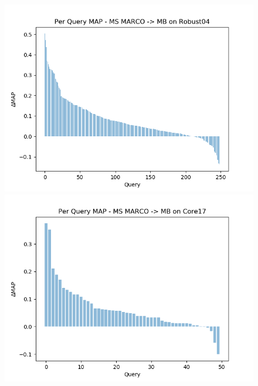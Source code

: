 \begin{figure}[b!]
	\centering
    \begin{minipage}{0.33\textwidth}
        \centering
        \includegraphics[width=\textwidth]{figures/perquery1.png}
    \end{minipage}\hfill
    \begin{minipage}{0.33\textwidth}
        \centering
        \includegraphics[width=\textwidth]{figures/perquery2.png}
    \end{minipage}\hfill
    \begin{minipage}{0.33\textwidth}
        \centering

\end{minipage}
\end{figure}
